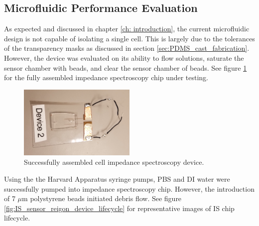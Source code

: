 \subsection{Microfluidic Performance Evaluation}

\par As expected and discussed in chapter \ref{ch: introduction}, the current microfluidic design is not capable of isolating a single cell. This is largely due to the tolerances of the transparency masks as discussed in section \ref{sec:PDMS_cast_fabrication}. However, the device was evaluated on its ability to flow solutions, saturate the sensor chamber with beads, and clear the sensor chamber of beads. See figure \ref{fig:assembled_good_device} for the fully assembled impedance spectroscopy chip under testing. 

\begin{figure}[h]
    \centering
    \includegraphics[width=0.5\textwidth]{images/device_22.jpg}
    \caption{Successfully assembled cell impedance spectroscopy device.}
    \label{fig:assembled_good_device}
\end{figure}

\par Using the the Harvard Apparatus syringe pumps, PBS and DI water were successfully pumped into impedance spectroscopy chip. However, the introduction of 7 $\mu$m polystyrene beads initiated debris flow. See figure \ref{fig:IS_sensor_reigon_device_lifecycle} for representative images of IS chip lifecycle.

